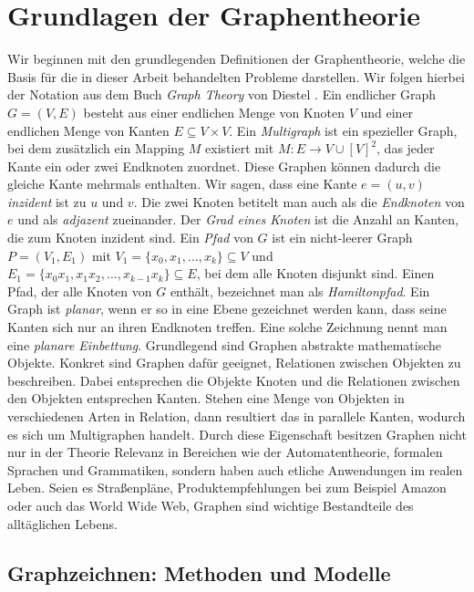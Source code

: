 \documentclass[bachelor, german]{algothesis}
\begin{document}
\section{Grundlagen der Graphentheorie}
Wir beginnen mit den grundlegenden Definitionen der Graphentheorie, welche die Basis für die in dieser Arbeit behandelten Probleme darstellen. Wir folgen hierbei der Notation aus dem Buch \textit{Graph Theory} von Diestel \cite{GraohTh}. Ein endlicher Graph $G = (V,E)$ besteht aus einer endlichen Menge von Knoten $V$ und einer endlichen Menge von Kanten $E \subseteq V \times V$. Ein \textit{Multigraph} ist ein spezieller Graph, bei dem zusätzlich ein Mapping $M$ existiert mit $M: E \rightarrow V \cup [V]^2$, das jeder Kante ein oder zwei Endknoten zuordnet. Diese Graphen können dadurch die gleiche Kante mehrmals enthalten. Wir sagen, dass eine Kante $e = (u,v)$ \textit{inzident} ist zu $u$ und $v$. Die zwei Knoten betitelt man auch als die \textit{Endknoten} von $e$ und als \textit{adjazent} zueinander. Der \textit{Grad eines Knoten} ist die Anzahl an Kanten, die zum Knoten inzident sind. \newline
Ein \textit{Pfad} von $G$ ist ein nicht-leerer Graph $P = (V_1,E_1)$ mit  $V_1 = \{x_0,x_1,\dots, x_k\} \subseteq V$ und $E_1 = \{x_0x_1,x_1x_2,\dots,x_{k-1}x_k\} \subseteq E$, bei dem alle Knoten disjunkt sind. Einen Pfad, der alle Knoten von $G$ enthält, bezeichnet man als \textit{Hamiltonpfad}.\newline
Ein Graph ist \textit{planar}, wenn er so in eine Ebene gezeichnet werden kann, dass seine Kanten sich nur an ihren Endknoten treffen. Eine solche Zeichnung nennt man eine \textit{planare Einbettung}. \newline
Grundlegend sind Graphen abstrakte mathematische Objekte.
Konkret sind Graphen dafür geeignet, Relationen zwischen Objekten zu beschreiben. Dabei entsprechen die Objekte Knoten und die Relationen zwischen den Objekten entsprechen Kanten. Stehen eine Menge von Objekten in verschiedenen Arten in Relation, dann resultiert das in parallele Kanten, wodurch es sich um Multigraphen handelt. Durch diese Eigenschaft besitzen Graphen nicht nur in der Theorie Relevanz in Bereichen wie der Automatentheorie, formalen Sprachen und Grammatiken, sondern haben auch etliche Anwendungen im realen Leben. Seien es Straßenpläne, Produktempfehlungen bei zum Beispiel Amazon oder auch das World Wide Web, Graphen sind wichtige Bestandteile des alltäglichen Lebens\cite{DrawingMeth}.

\subsection{Graphzeichnen: Methoden und Modelle}
\end{document}
